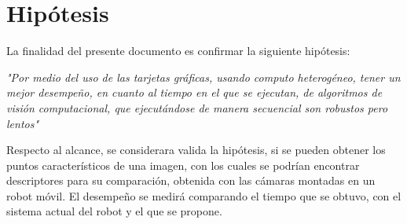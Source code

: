\section{Hipótesis} 

La finalidad del presente documento es  confirmar la siguiente hipótesis:

\begin{center}
\textit{"Por medio del uso de las tarjetas gráficas, usando computo heterogéneo, tener un mejor desempeño, en cuanto al tiempo en el que se ejecutan, de algoritmos de visión computacional, que ejecutándose de manera secuencial son robustos pero lentos"}

\end{center}

Respecto al alcance, se considerara valida la hipótesis, si se pueden obtener los puntos característicos de una imagen, con los cuales se podrían encontrar descriptores para su comparación, obtenida con las cámaras montadas en un robot móvil. El desempeño se medirá comparando el tiempo que se obtuvo, con el sistema actual del robot y el que se propone.  \\

\pagebreak

